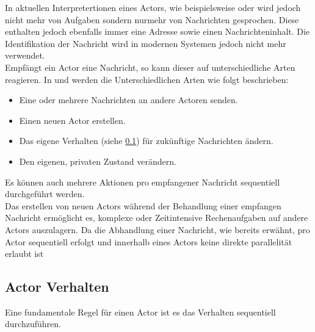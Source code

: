 In aktuellen Interpretertionen eines Actors, wie beispielsweise \cite{Vernon2015ReactiveAkka} oder \cite{Brown2016ReactiveAkka.net.} wird jedoch nicht mehr von Aufgaben sondern nurmehr von Nachrichten gesprochen. Diese enthalten jedoch ebenfalls immer eine Adresse sowie einen Nachrichteninhalt. Die Identifikation der Nachricht wird in modernen Systemen jedoch nicht mehr verwendet. \\
Empfängt ein Actor eine Nachricht, so kann dieser auf unterschiedliche Arten reagieren. In \citep{Agha1985ActorsSystems} und \citep{Vernon2015ReactiveAkka} werden die Unterschiedlichen Arten wie folgt beschrieben:
\begin{itemize}
    \item Eine oder mehrere Nachrichten an andere Actoren senden.
    \item Einen neuen Actor erstellen.
    \item Das eigene Verhalten (siehe \ref{actorBehaviour}) für zukünftige Nachrichten ändern.
    \item Den eigenen, privaten Zustand verändern.
\end{itemize}
Es können auch mehrere Aktionen pro empfangener Nachricht sequentiell durchgeführt werden. \\
Das erstellen von neuen Actors während der Behandlung einer empfangen Nachricht ermöglicht es, komplexe oder Zeitintensive Rechenaufgaben auf andere Actors auszulagern. Da die Abhandlung einer Nachricht, wie bereits erwähnt, pro Actor sequentiell erfolgt und innerhalb eines Actors keine direkte parallelität erlaubt ist



\subsection{Actor Verhalten}
\label{actorBehaviour}
Eine fundamentale Regel für einen Actor ist es das Verhalten sequentiell durchzuführen.
\subsection{}

